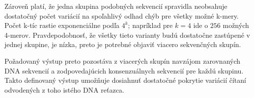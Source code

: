 Zároveň platí, že jedna skupina podobných sekvencií spravidla neobsahuje dostatočný počet variácií na spoľahlivý odhad chýb pre všetky možné k-mery.
Počet k-tíc rastie exponenciálne podľa $4^k$; napríklad pre $k=4$ ide o $256$ možných 4-merov.
Pravdepodobnosť, že všetky tieto varianty budú dostatočne zastúpené v jednej skupine, je nízka, preto je potrebné objaviť viacero sekvenčných skupín.

Požadovaný výstup preto pozostáva z viacerých skupín navzájom zarovnaných DNA sekvencií a zodpovedajúcich konsenzuálnych sekvencií pre každú skupinu.
Takto definovaný výstup umožňuje dosiahnuť dostatočné pokrytie variácií čítaní odvodených z toho istého DNA reťazca.



